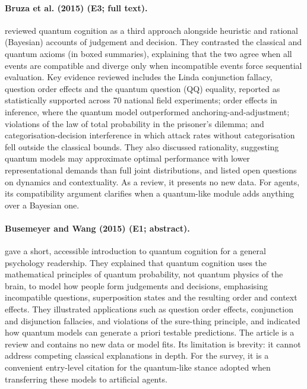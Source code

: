 \documentclass[10pt,a4paper]{article}
\begin{document}
\paragraph{Bruza et al. (2015) (E3; full text).} \citet{Bruza2015} reviewed quantum cognition as a third approach alongside heuristic and rational (Bayesian) accounts of judgement and decision. They contrasted the classical and quantum axioms (in boxed summaries), explaining that the two agree when all events are compatible and diverge only when incompatible events force sequential evaluation. Key evidence reviewed includes the Linda conjunction fallacy, question order effects and the quantum question (QQ) equality, reported as statistically supported across 70 national field experiments; order effects in inference, where the quantum model outperformed anchoring-and-adjustment; violations of the law of total probability in the prisoner's dilemma; and categorisation-decision interference in which attack rates without categorisation fell outside the classical bounds. They also discussed rationality, suggesting quantum models may approximate optimal performance with lower representational demands than full joint distributions, and listed open questions on dynamics and contextuality. As a review, it presents no new data. For agents, its compatibility argument clarifies when a quantum-like module adds anything over a Bayesian one.

\paragraph{Busemeyer and Wang (2015) (E1; abstract).} \citet{Busemeyer2015} gave a short, accessible introduction to quantum cognition for a general psychology readership. They explained that quantum cognition uses the mathematical principles of quantum probability, not quantum physics of the brain, to model how people form judgements and decisions, emphasising incompatible questions, superposition states and the resulting order and context effects. They illustrated applications such as question order effects, conjunction and disjunction fallacies, and violations of the sure-thing principle, and indicated how quantum models can generate a priori testable predictions. The article is a review and contains no new data or model fits. Its limitation is brevity: it cannot address competing classical explanations in depth. For the survey, it is a convenient entry-level citation for the quantum-like stance adopted when transferring these models to artificial agents.
\end{document}
